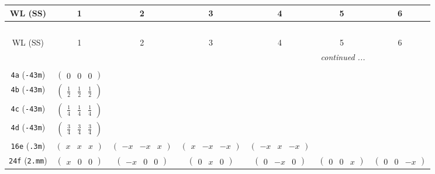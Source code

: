 \documentclass[fleqn,9pt,landscape]{jsarticle}
\begin{document}
\begin{center}
\renewcommand{\arraystretch}{1.2}
\begin{longtable}{ccccccc}
 \hline \hline
WL (SS) & 1 & 2 & 3 & 4 & 5 & 6 \\ \hline \endfirsthead

\multicolumn{6}{l}{\tablename\ \thetable{}} \\
 \hline \hline
WL (SS) & 1 & 2 & 3 & 4 & 5 & 6 \\ \hline \endhead

 \hline \hline
\multicolumn{6}{r}{\footnotesize\it continued ...} \\ \endfoot

 \hline \hline
\multicolumn{6}{r}{} \\ \endlastfoot

{\tt 4a} ({\tt -43m}) & $ \begin{pmatrix} 0 & 0 & 0 \end{pmatrix} $ & $  $ & $  $ & $  $ & $  $ & $  $ \\ \hline
{\tt 4b} ({\tt -43m}) & $ \begin{pmatrix} \frac{1}{2} & \frac{1}{2} & \frac{1}{2} \end{pmatrix} $ & $  $ & $  $ & $  $ & $  $ & $  $ \\ \hline
{\tt 4c} ({\tt -43m}) & $ \begin{pmatrix} \frac{1}{4} & \frac{1}{4} & \frac{1}{4} \end{pmatrix} $ & $  $ & $  $ & $  $ & $  $ & $  $ \\ \hline
{\tt 4d} ({\tt -43m}) & $ \begin{pmatrix} \frac{3}{4} & \frac{3}{4} & \frac{3}{4} \end{pmatrix} $ & $  $ & $  $ & $  $ & $  $ & $  $ \\ \hline
{\tt 16e} ({\tt .3m}) & $ \begin{pmatrix} x & x & x \end{pmatrix} $ & $ \begin{pmatrix} - x & - x & x \end{pmatrix} $ & $ \begin{pmatrix} x & - x & - x \end{pmatrix} $ & $ \begin{pmatrix} - x & x & - x \end{pmatrix} $ & $  $ & $  $ \\ \hline
{\tt 24f} ({\tt 2.mm}) & $ \begin{pmatrix} x & 0 & 0 \end{pmatrix} $ & $ \begin{pmatrix} - x & 0 & 0 \end{pmatrix} $ & $ \begin{pmatrix} 0 & x & 0 \end{pmatrix} $ & $ \begin{pmatrix} 0 & - x & 0 \end{pmatrix} $ & $ \begin{pmatrix} 0 & 0 & x \end{pmatrix} $ & $ \begin{pmatrix} 0 & 0 & - x \end{pmatrix} $ \\ \hline

\end{longtable}
\end{center}
\end{document}
